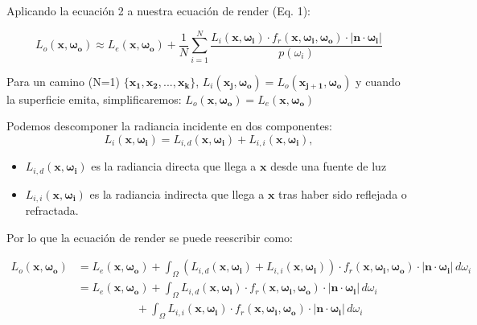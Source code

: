 \documentclass{article}
\begin{document}
Aplicando la ecuación 2 a nuestra ecuación de render (Eq. 1):

\begin{equation}
  L_o(\mathbf{x}, \mathbf{\omega_{o}}) \approx L_e(\mathbf{x}, \mathbf{\omega_{o}}) + \frac{1}{N} \sum_{i=1}^{N} \frac{L_i(\mathbf{x}, \mathbf{\omega_{i}}) \cdot f_r(\mathbf{x}, \mathbf{\omega_{i}}, \mathbf{\omega_{o}}) \cdot  |\mathbf{n} \cdot \mathbf{\omega_{i}}|}{p(\omega_{i})}
\end{equation}


Para un camino (N=1)
\(\{\mathbf{x_{1}}, \mathbf{x_{2}}, ..., \mathbf{x_{k}}\}\),
\(L_{i}(\mathbf{x_{j}}, \mathbf{\omega_{o}})=L_{o}(\mathbf{x_{j+1}}, \mathbf{\omega_{o}})\)
y cuando la superficie emita, simplificaremos:
\(L_{o}(\mathbf{x}, \mathbf{\omega_{o}})=L_{e}(\mathbf{x}, \mathbf{\omega_{o}})\)

Podemos descomponer la radiancia incidente en dos componentes:
\[L_i(\mathbf{x}, \mathbf{\omega_{i}}) = L_{i,d}(\mathbf{x}, \mathbf{\omega_{i}}) + L_{i,i}(\mathbf{x}, \mathbf{\omega_{i}}),\]

\begin{itemize}
  \item \(L_{i,d}(\mathbf{x}, \mathbf{\omega_{i}})\) es la radiancia directa que
        llega a \(\mathbf{x}\) desde una fuente de luz
  \item \(L_{i,i}(\mathbf{x}, \mathbf{\omega_{i}})\) es la radiancia indirecta
        que llega a \(\mathbf{x}\) tras haber sido reflejada o refractada.
\end{itemize}

Por lo que la ecuación de render se puede reescribir como:

\begin{equation}
  \begin{split}
    L_o(\mathbf{x}, \mathbf{\omega_{o}}) & = L_e(\mathbf{x}, \mathbf{\omega_{o}}) + \int_{\Omega} (L_{i,d}(\mathbf{x}, \mathbf{\omega_{i}}) + L_{i,i}(\mathbf{x}, \mathbf{\omega_{i}})) \cdot f_r(\mathbf{x}, \mathbf{\omega_{i}}, \mathbf{\omega_{o}}) \cdot  |\mathbf{n} \cdot \mathbf{\omega_{i}}| \, d\omega_{i} \\
                                         & = L_e(\mathbf{x}, \mathbf{\omega_{o}})
                                           + \int_{\Omega} L_{i,d}(\mathbf{x}, \mathbf{\omega_{i}}) \cdot f_r(\mathbf{x}, \mathbf{\omega_{i}}, \mathbf{\omega_{o}}) \cdot  |\mathbf{n} \cdot \mathbf{\omega_{i}}| \, d\omega_{i} \\
                                         &\quad\quad\quad\quad\quad\  + \int_{\Omega} L_{i,i}(\mathbf{x}, \mathbf{\omega_{i}}) \cdot f_r(\mathbf{x}, \mathbf{\omega_{i}}, \mathbf{\omega_{o}}) \cdot  |\mathbf{n} \cdot \mathbf{\omega_{i}}| \, d\omega_{i} \\
  \end{split}
\end{equation}
\end{document}
